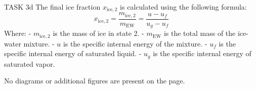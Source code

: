 TASK 3d  
The final ice fraction \( x_{\text{ice},2} \) is calculated using the following formula:  
\[
x_{\text{ice},2} = \frac{m_{\text{ice},2}}{m_{\text{EW}}} = \frac{u - u_f}{u_g - u_f}
\]  
Where:  
- \( m_{\text{ice},2} \) is the mass of ice in state 2.  
- \( m_{\text{EW}} \) is the total mass of the ice-water mixture.  
- \( u \) is the specific internal energy of the mixture.  
- \( u_f \) is the specific internal energy of saturated liquid.  
- \( u_g \) is the specific internal energy of saturated vapor.  

No diagrams or additional figures are present on the page.